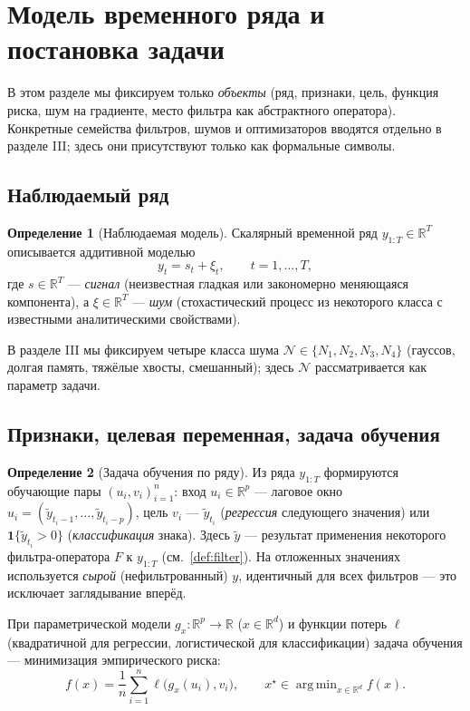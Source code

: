 \documentclass[conference]{IEEEtran}
\theoremstyle{plain}
\theoremstyle{definition}
\newtheorem{definition}{Определение}
\newcommand{\R}{\mathbb{R}}
\DeclareMathOperator*{\argmin}{arg\,min}
\begin{document}
\section{Модель временного ряда и постановка задачи}

В этом разделе мы фиксируем только \emph{объекты} (ряд, признаки, цель,
функция риска, шум на градиенте, место фильтра как абстрактного
оператора). Конкретные семейства фильтров, шумов и оптимизаторов
вводятся отдельно в разделе III; здесь они присутствуют только как
формальные символы.

\subsection{Наблюдаемый ряд}
\begin{definition}[Наблюдаемая модель]\label{def:obs}
Скалярный временной ряд $y_{1:T}\in\R^T$ описывается аддитивной
моделью
\begin{equation}
y_t = s_t + \xi_t, \qquad t=1,\dots,T, \label{eq:obs}
\end{equation}
где $s\in\R^T$ --- \emph{сигнал} (неизвестная гладкая или закономерно
меняющаяся компонента), а $\xi\in\R^T$ --- \emph{шум} (стохастический
процесс из некоторого класса с известными аналитическими свойствами).
\end{definition}

В разделе III мы фиксируем четыре класса шума $\mathcal N\in\{N_1,N_2,N_3,N_4\}$
(гауссов, долгая память, тяжёлые хвосты, смешанный); здесь $\mathcal N$
рассматривается как параметр задачи.

\subsection{Признаки, целевая переменная, задача обучения}
\begin{definition}[Задача обучения по ряду]\label{def:learn}
Из ряда $y_{1:T}$ формируются обучающие пары $(u_i,v_i)_{i=1}^n$:
вход $u_i\in\R^p$ --- лаговое окно $u_i=(\tilde y_{t_i-1},\dots,\tilde y_{t_i-p})$,
цель $v_i$ --- $\tilde y_{t_i}$ (\emph{регрессия} следующего значения) или
$\mathbf 1\{\tilde y_{t_i}>0\}$ (\emph{классификация} знака). Здесь
$\tilde y$ --- результат применения некоторого фильтра-оператора $F$ к
$y_{1:T}$ (см.~\ref{def:filter}). На отложенных значениях используется
\emph{сырой} (нефильтрованный) $y$, идентичный для всех фильтров ---
это исключает заглядывание вперёд.

При параметрической модели $g_x\colon\R^p\to\R$ ($x\in\R^d$) и функции
потерь $\ell$ (квадратичной для регрессии, логистической для
классификации) задача обучения --- минимизация эмпирического риска:
\begin{equation}
f(x)=\frac1n\sum_{i=1}^n \ell\!\big(g_x(u_i),v_i\big),\qquad
x^\star\in\argmin_{x\in\R^d} f(x). \label{eq:risk}
\end{equation}
\end{definition}
\end{document}
